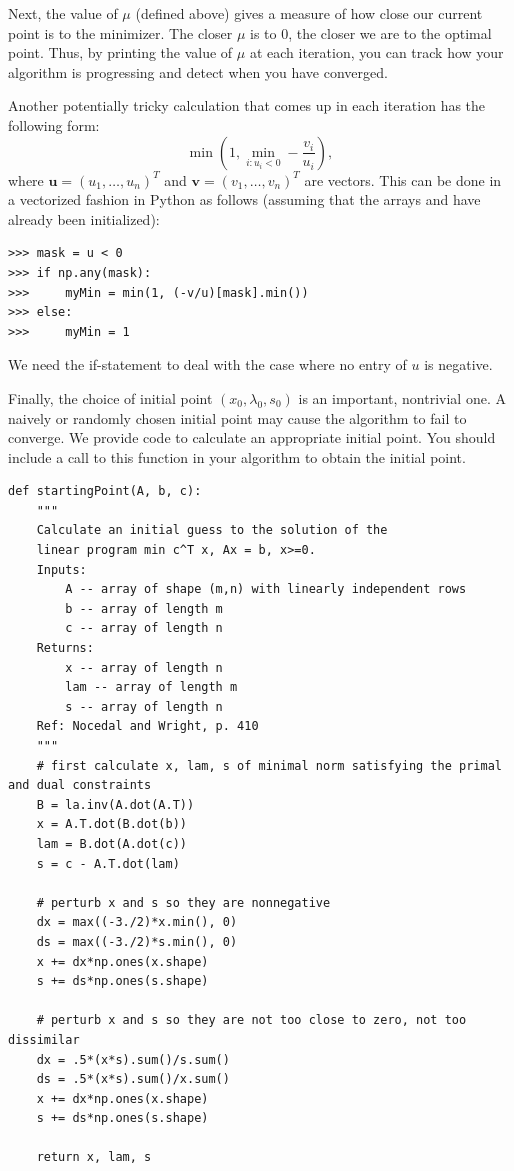 Next, the value of $\mu$ (defined above) gives a measure of how close our current point is to the minimizer.
The closer $\mu$ is to 0, the closer we are to the optimal point. Thus, by printing the value of $\mu$ at
each iteration, you can track how your algorithm is progressing and detect when you have converged.

Another potentially tricky calculation that comes up in each iteration has the following form:
\[
\min\left(1, \displaystyle\min_{i : u_i < 0}-\frac{v_i}{u_i}\right),
\]
where $\mathbf{u} = (u_1, \ldots, u_n)^T$ and $\mathbf{v} = (v_1, \ldots, v_n)^T$ are vectors.
This can be done in a vectorized fashion in Python as follows (assuming that the arrays  and 
have already been initialized):
\begin{lstlisting}
>>> mask = u < 0
>>> if np.any(mask):
>>>     myMin = min(1, (-v/u)[mask].min())
>>> else:
>>>     myMin = 1
\end{lstlisting}
We need the if-statement to deal with the case where no entry of $u$ is negative.

Finally, the choice of initial point $(x_0, \lambda_0, s_0)$ is an important, nontrivial one. 
A naively or randomly chosen initial point may cause the algorithm to fail to converge.
We provide code to calculate an appropriate initial point. You should include a call to this function in your algorithm to obtain the initial point.

\begin{lstlisting}
def startingPoint(A, b, c):
    """
    Calculate an initial guess to the solution of the
    linear program min c^T x, Ax = b, x>=0.
    Inputs:
        A -- array of shape (m,n) with linearly independent rows
        b -- array of length m
        c -- array of length n
    Returns:
        x -- array of length n
        lam -- array of length m
        s -- array of length n
    Ref: Nocedal and Wright, p. 410
    """
    # first calculate x, lam, s of minimal norm satisfying the primal and dual constraints
    B = la.inv(A.dot(A.T))
    x = A.T.dot(B.dot(b))
    lam = B.dot(A.dot(c))
    s = c - A.T.dot(lam)

    # perturb x and s so they are nonnegative
    dx = max((-3./2)*x.min(), 0)
    ds = max((-3./2)*s.min(), 0)
    x += dx*np.ones(x.shape)
    s += ds*np.ones(s.shape)

    # perturb x and s so they are not too close to zero, not too dissimilar
    dx = .5*(x*s).sum()/s.sum()
    ds = .5*(x*s).sum()/x.sum()
    x += dx*np.ones(x.shape)
    s += ds*np.ones(s.shape)

    return x, lam, s
\end{lstlisting}

